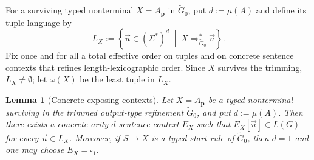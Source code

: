 \documentclass[11pt,a4paper]{article}
\newtheorem{lemma}[theorem]{Lemma}
\theoremstyle{remark}
\newcommand{\tuple}[1]{\vec{#1}}
\newcommand{\blank}{\square}
\begin{document}
For a surviving typed nonterminal \(X=A_{\mathbf p}\) in
\(\widetilde G_0\), put \(d:=\mu(A)\) and define its tuple language by
\[
  L_X
  :=
  \left\{
    \tuple u\in(\Sigma^*)^d
    \;\middle|\;
    X\Rightarrow_{\widetilde G_0}^*\tuple u
  \right\}.
\]
Fix once and for all a total effective order on tuples and on concrete sentence
contexts that refines length-lexicographic order.  Since \(X\) survives the
trimming, \(L_X\ne\emptyset\); let \(\omega(X)\) be the least tuple in \(L_X\).

\begin{lemma}[Concrete exposing contexts]
\label{lem:exposing-contexts}
Let \(X=A_{\mathbf p}\) be a typed nonterminal surviving in the trimmed
output-type refinement \(\widetilde G_0\), and put \(d:=\mu(A)\).
Then there exists a concrete arity-\(d\) sentence context \(E_X\) such that
\(E_X[\tuple u]\in L(G)\) for every \(\tuple u\in L_X\).  Moreover, if
\(\widetilde S\to X\) is a typed start rule of \(\widetilde G_0\), then
\(d=1\) and one may choose \(E_X=\blank_1\).
\end{lemma}
\end{document}
